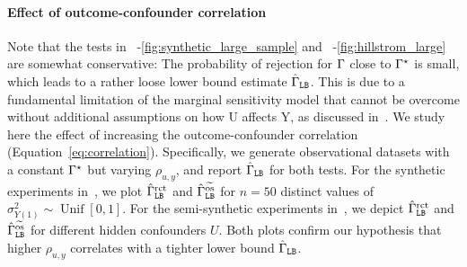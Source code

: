 \paragraph{Effect of outcome-confounder correlation} 
Note that the tests in ~-\ref{fig:synthetic_large_sample} and ~-\ref{fig:hillstrom_large} are somewhat conservative: The probability of rejection for $\Gamma$ close to $\Gamma^{\star}$ is small, which leads to a rather loose lower bound estimate $\hat{\Gamma}_{\texttt{LB}}$. This is due to a fundamental limitation of the marginal sensitivity model that cannot be overcome without additional assumptions on how U affects Y, as discussed in~. We study here the effect of increasing the outcome-confounder correlation  (Equation~\ref{eq:correlation}).
Specifically, we generate observational datasets with a constant $\Gamma^{\star}$ but varying $\rho_{u,y}$, and report $\hat{\Gamma}_{\texttt{LB}}$ for both tests. For the synthetic experiments in~, we plot $\hat{\Gamma}_{\texttt{LB}}^{\mathrm{rct}}$ and $\hat{\Gamma}_{\texttt{LB}}^{\widetilde{\mathrm{os}}}$ for $n=50$ distinct values of $\sigma^2_{Y(1)} \sim \operatorname{Unif}[0,1]$. For the semi-synthetic experiments in~, we depict $\hat{\Gamma}_{\texttt{LB}}^{\mathrm{rct}}$ and $\hat{\Gamma}_{\texttt{LB}}^{\widetilde{\mathrm{os}}}$ for different hidden confounders $U$. Both plots confirm our hypothesis that higher $\rho_{u,y}$ correlates with a tighter lower bound $\hat{\Gamma}_{\texttt{LB}}$.




